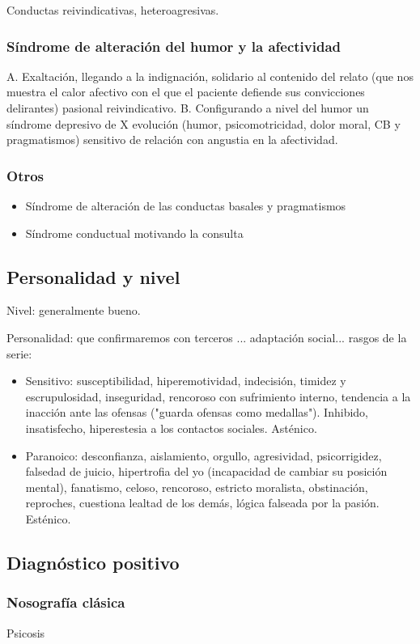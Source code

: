 \documentclass{scrbook}
\begin{document}
Conductas reivindicativas, heteroagresivas.

\subsubsection*{Síndrome de alteración del humor y la afectividad}
A. Exaltación, llegando a la indignación, solidario al contenido del relato (que nos muestra el calor afectivo con el que el paciente defiende sus convicciones delirantes) pasional reivindicativo.
B. Configurando a nivel del humor un síndrome depresivo de X evolución (humor, psicomotricidad, dolor moral, CB y pragmatismos) sensitivo de relación con angustia en la afectividad. 
\subsubsection*{Otros}
\begin{itemize}
	\item Síndrome de alteración de las conductas basales y pragmatismos
	\item Síndrome conductual motivando la consulta
\end{itemize}
\subsection*{Personalidad y nivel}

Nivel: generalmente bueno.

Personalidad: que confirmaremos con terceros ... adaptación social... rasgos de la serie:
\begin{itemize}
	\item Sensitivo: susceptibilidad, hiperemotividad, indecisión, timidez y escrupulosidad, inseguridad, rencoroso con sufrimiento interno, tendencia a la inacción ante las ofensas ("guarda ofensas como medallas"). Inhibido, insatisfecho, hiperestesia a los contactos sociales. Asténico.
	\item Paranoico: desconfianza, aislamiento, orgullo, agresividad, psicorrigidez, falsedad de juicio, hipertrofia del yo (incapacidad de cambiar su posición mental), fanatismo, celoso, rencoroso, estricto moralista, obstinación, reproches, cuestiona lealtad de los demás, lógica falseada por la pasión. Esténico.
\end{itemize}
\subsection*{Diagnóstico positivo}
\subsubsection*{Nosografía clásica}
Psicosis
\end{document}
